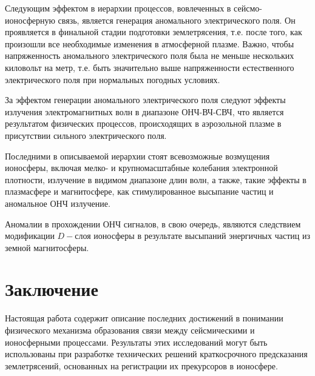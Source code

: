 \documentclass[12pt, oneside, a4paper]{article}
\begin{document}
Следующим эффектом в иерархии процессов, вовлеченных в сейсмо-ионосферную связь, является  генерация аномального электрического поля. Он проявляется в финальной стадии подготовки землетрясения, т.е. после того, как произошли все необходимые изменения в атмосферной плазме. Важно, чтобы напряженность аномального электрического поля была не меньше нескольких киловольт на метр, т.е. быть значительно выше напряженности естественного электрического поля при нормальных погодных условиях.

За эффектом генерации аномального электрического поля следуют эффекты излучения электромагнитных волн в диапазоне ОНЧ-ВЧ-СВЧ, что является результатом физических процессов, происходящих в аэрозольной плазме в присутствии сильного электрического поля.

Последними в описываемой иерархии стоят всевозможные возмущения ионосферы, включая мелко- и крупномасштабные колебания электронной плотности, излучение в видимом диапазоне длин волн, а также, такие эффекты в плазмасфере и магнитосфере, как стимулированное высыпание частиц и аномальное ОНЧ излучение.

Аномалии в прохождении ОНЧ сигналов, в свою очередь, являются следствием модификации $D-$слоя ионосферы в результате высыпаний энергичных частиц из земной магнитосферы.
\section{Заключение}
Настоящая работа содержит описание последних достижений в понимании физического механизма образования связи между сейсмическими и ионосферными процессами. Результаты этих исследований могут быть использованы при разработке технических решений краткосрочного предсказания землетрясений, основанных на регистрации их прекурсоров в ионосфере. 
\newpage


\end{document}
